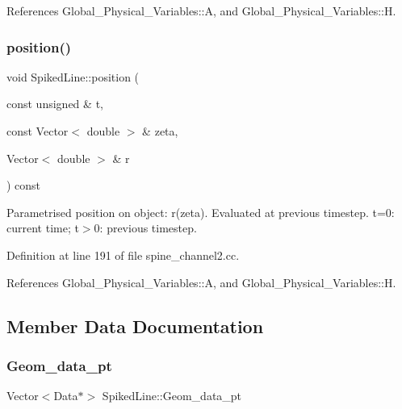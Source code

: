 References Global\+\_\+\+Physical\+\_\+\+Variables\+::A, and Global\+\_\+\+Physical\+\_\+\+Variables\+::H.

\mbox{\label{classSpikedLine_ac6356a30cad06346e46a494e226d5219}} 
\subsubsection{\texorpdfstring{position()}{position()}\hspace{0.1cm}{\footnotesize\ttfamily [2/2]}}
{\footnotesize\ttfamily void Spiked\+Line\+::position (\begin{DoxyParamCaption}\item[{const unsigned \&}]{t,  }\item[{const Vector$<$ double $>$ \&}]{zeta,  }\item[{Vector$<$ double $>$ \&}]{r }\end{DoxyParamCaption}) const\hspace{0.3cm}{\ttfamily [inline]}}



Parametrised position on object\+: r(zeta). Evaluated at previous timestep. t=0\+: current time; t$>$0\+: previous timestep. 



Definition at line 191 of file spine\+\_\+channel2.\+cc.



References Global\+\_\+\+Physical\+\_\+\+Variables\+::A, and Global\+\_\+\+Physical\+\_\+\+Variables\+::H.



\subsection{Member Data Documentation}
\mbox{\label{classSpikedLine_a62f6dbf18fd631df474089e41ae7afeb}} 
\subsubsection{\texorpdfstring{Geom\+\_\+data\+\_\+pt}{Geom\_data\_pt}}
{\footnotesize\ttfamily Vector$<$Data$\ast$$>$ Spiked\+Line\+::\+Geom\+\_\+data\+\_\+pt\hspace{0.3cm}{\ttfamily [private]}}



